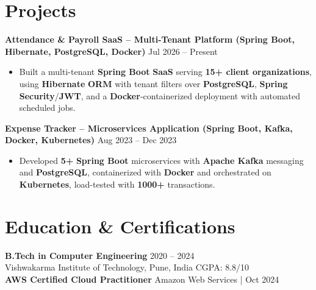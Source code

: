 \documentclass[a4paper,10pt]{article}
\begin{document}
\section*{Projects}

\textbf{Attendance \& Payroll SaaS -- Multi-Tenant Platform (Spring Boot, Hibernate, PostgreSQL, Docker)} \hfill Jul 2026 -- Present
\begin{itemize}[leftmargin=*]
    \item Built a multi-tenant \textbf{Spring Boot} \textbf{SaaS} serving \textbf{15+ client organizations}, using \textbf{Hibernate} \textbf{ORM} with tenant filters over \textbf{PostgreSQL}, \textbf{Spring Security}/\textbf{JWT}, and a \textbf{Docker}-containerized deployment with automated scheduled jobs.
\end{itemize}

\textbf{Expense Tracker -- Microservices Application (Spring Boot, Kafka, Docker, Kubernetes)} \hfill Aug 2023 -- Dec 2023
\begin{itemize}[leftmargin=*]
    \item Developed \textbf{5+} \textbf{Spring Boot} microservices with \textbf{Apache Kafka} messaging and \textbf{PostgreSQL}, containerized with \textbf{Docker} and orchestrated on \textbf{Kubernetes}, load-tested with \textbf{1000+} transactions.
\end{itemize}

\section*{Education \& Certifications}
\textbf{B.Tech in Computer Engineering} \hfill 2020 -- 2024 \\
Vishwakarma Institute of Technology, Pune, India \hfill CGPA: 8.8/10 \\
\textbf{AWS Certified Cloud Practitioner} \hfill Amazon Web Services \;|\; Oct 2024
\end{document}
